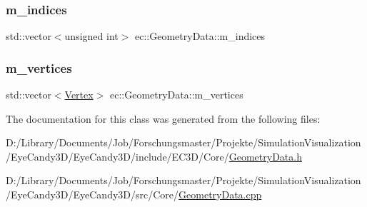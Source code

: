\subsubsection{\texorpdfstring{m\+\_\+indices}{m\_indices}}
{\footnotesize\ttfamily std\+::vector$<$unsigned int$>$ ec\+::\+Geometry\+Data\+::m\+\_\+indices}

\mbox{\label{classec_1_1_geometry_data_ade3f4dd48315b696846bb2c00267394c}} 
\subsubsection{\texorpdfstring{m\+\_\+vertices}{m\_vertices}}
{\footnotesize\ttfamily std\+::vector$<$\mbox{\hyperlink{structec_1_1_vertex}{Vertex}}$>$ ec\+::\+Geometry\+Data\+::m\+\_\+vertices}



The documentation for this class was generated from the following files\+:\begin{DoxyCompactItemize}
\item 
D\+:/\+Library/\+Documents/\+Job/\+Forschungsmaster/\+Projekte/\+Simulation\+Visualization/\+Eye\+Candy3\+D/\+Eye\+Candy3\+D/include/\+E\+C3\+D/\+Core/\mbox{\hyperlink{_geometry_data_8h}{Geometry\+Data.\+h}}\item 
D\+:/\+Library/\+Documents/\+Job/\+Forschungsmaster/\+Projekte/\+Simulation\+Visualization/\+Eye\+Candy3\+D/\+Eye\+Candy3\+D/src/\+Core/\mbox{\hyperlink{_geometry_data_8cpp}{Geometry\+Data.\+cpp}}\end{DoxyCompactItemize}
